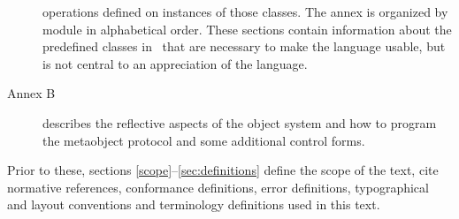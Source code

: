 \begin{optDefinition}
\begin{description}
    operations defined on instances of those classes.  The annex is organized by module in alphabetical order.
    These sections contain information about the predefined classes in \eulisp\
    that are necessary to make the language usable, but is not central to an
    appreciation of the language.
    \item[Annex B] describes the reflective aspects of the object system and how
    to program the metaobject protocol and some additional control forms.
\end{description}
%
Prior to these, sections \ref{scope}--\ref{sec:definitions} define the scope of
the text, cite normative references, conformance definitions, error definitions,
typographical and layout conventions and terminology definitions used in this
text.
\end{optDefinition}
%
\label{scope}
